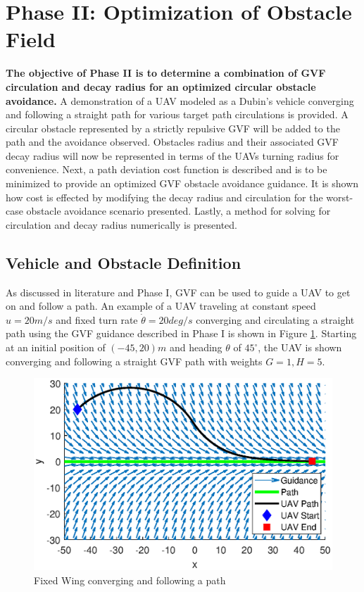 \documentclass[numbered,pdftex]{ohio-etd}
\begin{document}
\section{Phase II: Optimization of Obstacle Field}
\textbf{The objective of Phase II is to determine a combination of GVF circulation and decay radius for an optimized circular obstacle avoidance.} A demonstration of a UAV modeled as a Dubin's vehicle converging and following a straight path for various target path circulations is provided. A circular obstacle represented by a strictly repulsive GVF will be added to the path and the avoidance observed. Obstacles radius and their associated GVF decay radius will now be represented in terms of the UAVs turning radius for convenience. Next, a path deviation cost function is described and is to be minimized to provide an optimized GVF obstacle avoidance guidance. It is shown how cost is effected by modifying the decay radius and circulation for the worst-case obstacle avoidance scenario presented. Lastly, a method for solving for circulation and decay radius numerically is presented. 


\subsection{Vehicle and Obstacle Definition}

As discussed in literature and Phase I, GVF can be used to guide a UAV to get on and follow a path. An example of a UAV traveling at constant speed $u=20m/s$ and fixed turn rate $\dot{\theta}=20deg/s$ converging and circulating a straight path using the GVF guidance described in Phase I is shown in Figure \ref{fig:uavPathFollowDemo}. Starting at an initial position of $(-45,20)m$ and heading $\theta$ of $45^\circ$, the UAV is shown converging and following a straight GVF path with weights $G=1,H=5$.


\begin{figure}[H]
	\centering
	\includegraphics[trim=0 25 0 45,clip,width=14cm]{PaperFigures/Methods/uavPathFollowDemo}
	\caption{Fixed Wing converging and following a path}
	\label{fig:uavPathFollowDemo}
\end{figure}
\end{document}
